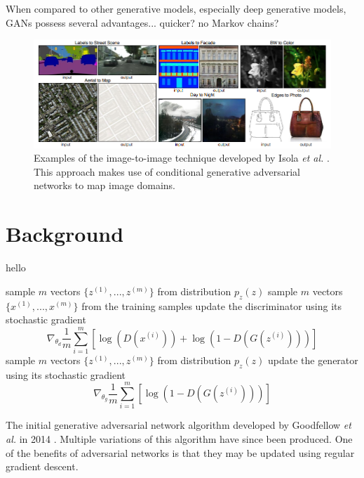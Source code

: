 \documentclass[11pt]{article}
\begin{document}
When compared to other generative models, especially deep generative models, GANs possess several advantages... quicker? no Markov chains?

\begin{figure}
\centering
\includegraphics[scale=0.65]{img2img}
\caption{Examples of the image-to-image technique developed by Isola \textit{et al.} \citep{2016arXiv161107004I}. This approach makes use of conditional generative adversarial networks to map image domains.}
\label{fig:Image to Image Examples}
\end{figure}

\section{Background}
hello

\begin{algorithm}[H]
  \SetAlgoLined
   \linebreak
   \linebreak
   {
     {
      sample $m$ vectors $\{z^{(1)},...,z^{(m)}\}$ from distribution $p_z(z)$\;
      sample $m$ vectors $\{x^{(1)},...,x^{(m)}\}$ from the training samples\;
      update the discriminator using its stochastic gradient
      $$\nabla_{\theta_d}\frac{1}{m}\sum_{i=1}^{m}[\log(D(x^{(i)}))+\log(1-D(G(z^{(i)})))]$$
    }
    sample $m$ vectors $\{z^{(1)},...,z^{(m)}\}$ from distribution $p_z(z)$\;
    update the generator using its stochastic gradient\;
    $$\nabla_{\theta_g}\frac{1}{m}\sum_{i=1}^{m}[\log(1-D(G(z^{(i)})))]$$
  }
  \caption{The initial generative adversarial network algorithm developed by Goodfellow \textit{et al.} in 2014 \citep{2014arXiv1406.2661G}. Multiple variations of this algorithm have since been produced. One of the benefits of adversarial networks is that they may be updated using regular gradient descent.}
\end{algorithm}
\end{document}
